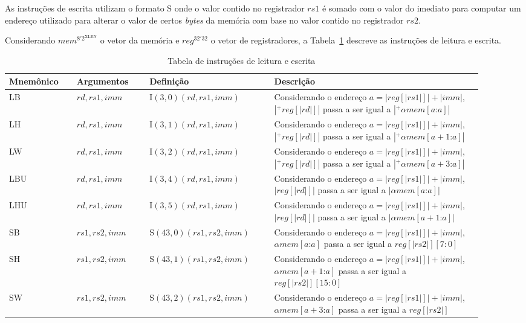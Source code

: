     As instruções de escrita utilizam o formato S onde o valor contido no registrador $rs1$ é somado com o valor 
    do imediato para computar um endereço utilizado para alterar o valor de certos \emph{bytes} da memória com 
    base no valor contido no registrador $rs2$.

    Considerando $mem^{8'2^\text{XLEN}}$ o vetor da memória e $reg^{32'32}$ o vetor de registradores, a
    Tabela~\ref{tab:rw32} descreve as instruções de leitura e escrita.

    \begin{table}
      \begin{tabular}{ |p{0.13\linewidth}||p{0.14\linewidth}|p{0.24\linewidth}|p{0.40\linewidth}| } 
        \hline
        Mnemônico & Argumentos & Definição & Descrição\\ \hline \hline

  LB & $rd, rs1, imm$ & I$(3, 0)(rd, rs1, imm)$ & Considerando o endereço $a = |reg[|rs1|]| + |imm|$, $|^+reg[|rd|]|$ passa a ser igual a $|^+ \alpha mem[a\text{:}a]|$ \\ \hline
  LH & $rd, rs1, imm$ & I$(3, 1)(rd, rs1, imm)$ & Considerando o endereço $a = |reg[|rs1|]| + |imm|$, $|^+reg[|rd|]|$ passa a ser igual a $|^+ \alpha mem[a+1\text{:}a]|$ \\ \hline
  LW & $rd, rs1, imm$ & I$(3, 2)(rd, rs1, imm)$ & Considerando o endereço $a = |reg[|rs1|]| + |imm|$, $|^+reg[|rd|]|$ passa a ser igual a $|^+ \alpha mem[a+3\text{:}a]|$ \\ \hline
  LBU & $rd, rs1, imm$ & I$(3, 4)(rd, rs1, imm)$ & Considerando o endereço $a = |reg[|rs1|]| + |imm|$, $|reg[|rd|]|$ passa a ser igual a $|\alpha mem[a\text{:}a]|$  \\ \hline
  LHU & $rd, rs1, imm$ & I$(3, 5)(rd, rs1, imm)$ & Considerando o endereço $a = |reg[|rs1|]| + |imm|$, $|reg[|rd|]|$ passa a ser igual a $|\alpha mem[a+1\text{:}a]|$ \\ \hline
  SB & $rs1, rs2, imm$ & S$(43, 0)(rs1, rs2, imm)$ & Considerando o endereço $a = |reg[|rs1|]| + |imm|$, $\alpha mem[a\text{:}a]$ passa a ser igual a $reg[|rs2|][7:0]$ \\ \hline
  SH & $rs1, rs2, imm$ & S$(43, 1)(rs1, rs2, imm)$ & Considerando o endereço $a = |reg[|rs1|]| + |imm|$, $\alpha mem[a+1\text{:}a]$ passa a ser igual a $reg[|rs2|][15:0]$\\ \hline
  SW & $rs1, rs2, imm$ & S$(43, 2)(rs1, rs2, imm)$ & Considerando o endereço $a = |reg[|rs1|]| + |imm|$, $\alpha mem[a+3\text{:}a]$ passa a ser igual a $reg[|rs2|]$\\ \hline

      \end{tabular}
    \caption{Tabela de instruções de leitura e escrita \label{tab:rw32}}
    \end{table}

